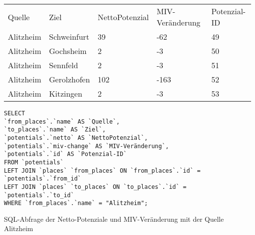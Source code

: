 \begin{tabularx}{\textwidth}{*5{X}}
Quelle & Ziel & NettoPotenzial & MIV-Veränderung & Potenzial-ID\\ 
Alitzheim & Schweinfurt & 39 & -62 & 49\\ 
Alitzheim & Gochsheim & 2 & -3 & 50\\ 
Alitzheim & Sennfeld & 2 & -3 & 51\\ 
Alitzheim & Gerolzhofen & 102 & -163 & 52\\ 
Alitzheim & Kitzingen & 2 & -3 & 53\\ 
\end{tabularx}        
\newline
\newline
\begin{listing}[htbp]
\begin{verbatim}
SELECT
`from_places`.`name` AS `Quelle`, 
`to_places`.`name` AS `Ziel`, 
`potentials`.`netto` AS `NettoPotenzial`, 
`potentials`.`miv-change` AS `MIV-Veränderung`, 
`potentials`.`id` AS `Potenzial-ID`
FROM `potentials`
LEFT JOIN `places` `from_places` ON `from_places`.`id` = `potentials`.`from_id`
LEFT JOIN `places` `to_places` ON `to_places`.`id` = `potentials`.`to_id`
WHERE `from_places`.`name` = "Alitzheim";
\end{verbatim}
\caption{SQL-Abfrage der Netto-Potenziale und MIV-Veränderung mit der Quelle Alitzheim}\label{lst-fz-alitzheim}
\end{listing}